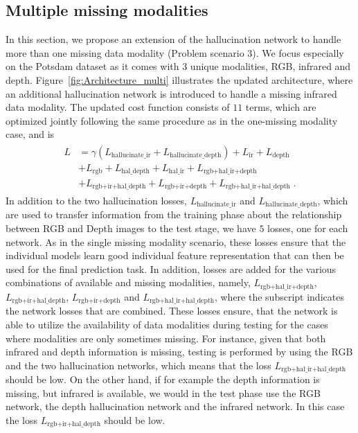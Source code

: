 \documentclass[journal]{IEEEtran}
\begin{document}
\subsection{Multiple missing modalities}
\label{sec:multiple_missing}
In this section, we propose an extension of the hallucination network to handle more than one missing data modality (Problem scenario 3). We focus especially on the Potsdam dataset as it comes with $3$ unique modalities, RGB, infrared and depth. Figure~\ref{fig:Architecture_multi} illustrates the updated architecture, where an additional hallucination network is introduced to handle a missing infrared data modality. The updated cost function consists of $11$ terms, which are optimized jointly following the same procedure as in the one-missing modality case, and is
\begin{align}
\label{lossfunction_multi}
    \begin{split}
    L &= \gamma (L_{\text{hallucinate\_ir}} + L_{\text{hallucinate\_depth}}) + L_{\text{ir}} + L_{\text{depth}} \\
    &+ L_{\text{rgb}} + L_{\text{hal\_depth}} + L_{\text{hal\_ir}} + L_{\text{rgb+hal\_ir+depth}} \\
    &+ L_{\text{rgb+ir+hal\_depth}} + L_{\text{rgb+ir+depth}} + L_{\text{rgb+hal\_ir+hal\_depth}} \;.
\end{split}
\end{align}
In addition to the two hallucination losses, $L_{\text{hallucinate\_ir}}$ and $L_{\text{hallucinate\_depth}}$, which are used to transfer information from the training phase about the relationship between RGB and Depth images to the test stage, we have $5$ losses, one for each network. As in the single missing modality scenario, these losses ensure that the individual models learn good individual feature representation that can then be used for the final prediction task. In addition, losses are added for the various combinations of available and missing modalities, namely, $L_{\text{rgb+hal\_ir+depth}}$, $L_{\text{rgb+ir+hal\_depth}}$, $L_{\text{rgb+ir+depth}}$ and $L_{\text{rgb+hal\_ir+hal\_depth}}$, where the subscript indicates the network losses that are combined. These losses ensure, that the network is able to utilize the availability of data modalities during testing for the cases where modalities are only sometimes missing. For instance, given that both infrared and depth information is missing, testing is performed by using the RGB and the two hallucination networks, which means that the loss $L_{\text{rgb+hal\_ir+hal\_depth}}$ should be low. On the other hand, if for example the depth information is missing, but infrared is available, we would in the test phase use the RGB network, the depth hallucination network and the infrared network. In this case the loss $L_{\text{rgb+ir+hal\_depth}}$ should be low.
\end{document}

